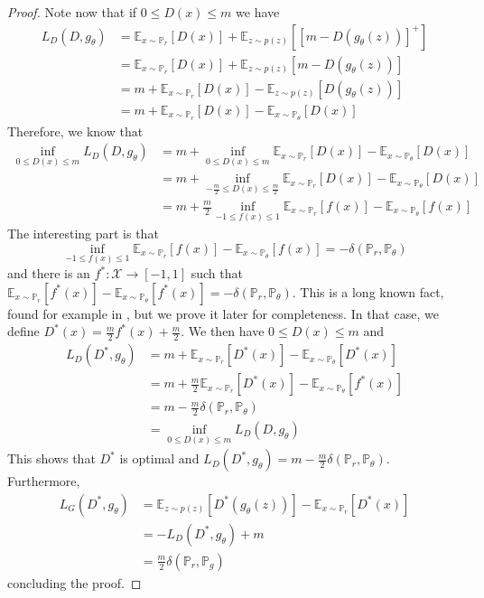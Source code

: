 \documentclass{article} %
\newcommand\EE{\mathbb{E}}
\newcommand\PP{\mathbb{P}}
\theoremstyle{definition}
\theoremstyle{definition}
\newcommand\manX{\mathcal{X}}
\begin{document}
\begin{appendices}
\begin{proof}
Note now that if $0 \leq D(x) \leq m$ we have
\begin{align*}
  L_D(D, g_\theta) &= \EE_{x \sim \PP_r}[D(x)] + \EE_{z \sim p(z)}[[m - D(g_\theta(z))]^+] \\
    &= \EE_{x \sim \PP_r}[D(x)] + \EE_{z \sim p(z)}[m - D(g_\theta(z))] \\
    &= m + \EE_{x \sim \PP_r}[D(x)] - \EE_{z \sim p(z)}[D(g_\theta(z))] \\
    &= m + \EE_{x \sim \PP_r}[D(x)] - \EE_{x \sim \PP_\theta}[D(x)]
\end{align*}
Therefore, we know that
\begin{align*}
  \inf_{0 \leq D(x) \leq m} L_D(D, g_\theta) &= m + \inf_{0 \leq D(x) \leq m} \EE_{x \sim \PP_r}[D(x)] - \EE_{x \sim \PP_\theta}[D(x)] \\
    &= m + \inf_{-\frac{m}{2} \leq D(x) \leq \frac{m}{2}} \EE_{x \sim \PP_r}[D(x)] - \EE_{x \sim \PP_\theta}[D(x)] \\
    &= m + \frac{m}{2} \inf_{-1 \leq f(x) \leq 1} \EE_{x \sim \PP_r}[f(x)] - \EE_{x \sim \PP_\theta}[f(x)]
\end{align*}
The interesting part is that
\begin{equation} \label{eq::radon}
\inf_{-1 \leq f(x) \leq 1} \EE_{x \sim \PP_r}[f(x)] - \EE_{x \sim \PP_\theta}[f(x)] = - \delta(\PP_r, \PP_\theta)
\end{equation}
and there is an $f^*: \manX \rightarrow [-1,1]$ such that $\EE_{x \sim \PP_r}[f^*(x)] -
\EE_{x \sim \PP_\theta}[f^*(x)] = - \delta(\PP_r, \PP_\theta)$. This is a long known fact,
found for example in \cite{Vil}, but we prove it later for completeness. In that case,
we define $D^*(x) = \frac{m}{2}f^*(x) + \frac{m}{2}$. We then have $0 \leq D(x) \leq m$ and
\begin{align*}
  L_D(D^*, g_\theta) 
    &= m + \EE_{x \sim \PP_r}[D^*(x)] - \EE_{x \sim \PP_\theta}[D^*(x)] \\
    &= m + \frac{m}{2} \EE_{x \sim \PP_r}[D^*(x)] - \EE_{x \sim \PP_\theta}[f^*(x)] \\
    &= m - \frac{m}{2} \delta(\PP_r, \PP_\theta) \\
    &= \inf_{0 \leq D(x) \leq m} L_D(D, g_\theta)
\end{align*}
This shows that $D^*$ is optimal and $L_D(D^*, g_\theta) = m - \frac{m}{2} \delta(\PP_r, \PP_\theta)$. Furthermore,
\begin{align*}
L_G(D^*, g_\theta) &= \EE_{z \sim p(z)}[D^*(g_\theta(z))] - \EE_{x \sim \PP_r}[D^*(x)] \\
  &= -L_D(D^*, g_\theta) + m \\
  &= \frac{m}{2} \delta(\PP_r, \PP_g)
\end{align*}
concluding the proof.


\end{proof}
\end{appendices}
\end{document}
